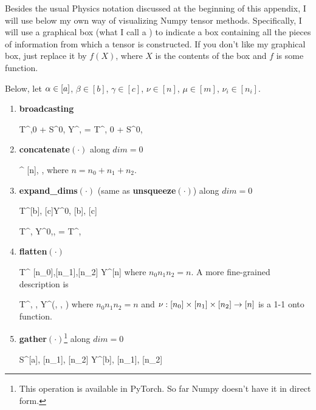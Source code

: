 Besides the usual Physics notation
discussed at the beginning of this appendix, I will
use below my own way of visualizing Numpy tensor methods. Specifically, I will
use a graphical box (what I call a ) to indicate
a box containing all the pieces of information
from which a tensor is constructed.
If you don't like my graphical box,
just replace it by $f(X)$,
where $X$ is the contents of the box and
$f$ is some function.

Below, let $\alpha\in[a]$, $\beta\in[b]$, $\gamma\in[c]$,
$\nu\in[n]$,
$\mu\in[m]$,
$\nu_i\in[n_i]$.


\begin{enumerate}
\item {\bf broadcasting}

\beq
T^{\alpha,0} + S^{0,\beta}
\rarrow Y^{\alp, \beta}=
T^{\alpha, 0} + S^{0,\beta}
\eeq

\item {\bf concatenate$(\cdot)$} along $dim=0$

\rarrow
{}^{
[n], \beta, \gamma}
\eeq
where $n= n_0 + n_1 + n_2$.

\item {\bf expand\_dims$(\cdot)$} (same as {\bf unsqueeze$(\cdot)$}) along $dim=0$

\beq
T^{[b], [c]}\rarrow Y^{0, [b], [c]}
\eeq

\beq
T^{\beta, \gamma}
\rarrow
Y^{0,\beta, \gamma} =  T^{\beta, \gamma}
\eeq

\item {\bf flatten$(\cdot)$}

\beq
T^{
{[n_0]},{[n_1]},{[n_2]}}\rarrow
Y^{[n]}
\eeq
where $n_0n_1n_2=n$.
A more fine-grained description is

\beq
T^{
{\alpha, \beta, \gamma}}\rarrow
Y^{\nu(\alpha, \beta, \gamma)}
\eeq
where
$n_0 n_1 n_2=n$ and
$\nu:[n_0]\times[n_1]\times[n_2]\rightarrow [n]$
is a 1-1 onto function.


\item {\bf gather$(\cdot)$}\footnote{This operation is available in
PyTorch. So far Numpy doesn't have it in direct form.} along $dim=0$


\beq
S^{[a], [n_1], [n_2]}
\rarrow Y^{[b], [n_1], [n_2]}
\eeq


\end{enumerate}
